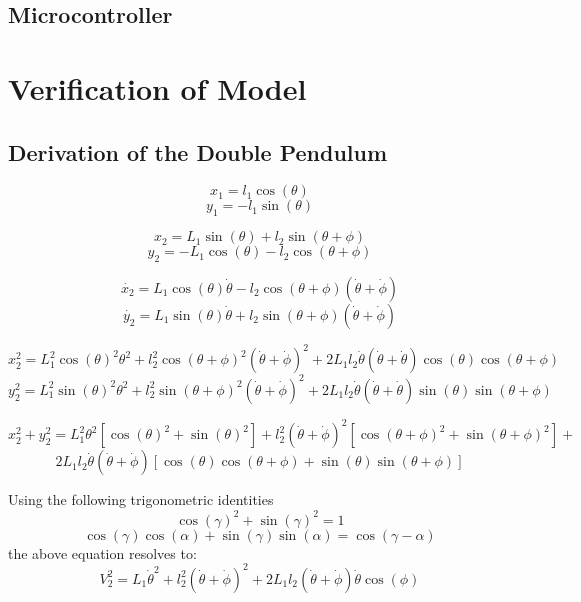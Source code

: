 \documentclass[a4paper,12pt]{article}
\begin{document}
	\subsection{Microcontroller}
	
	
	
	\section{Verification of Model}
	

	\newpage
	
	
	
	\newpage
	\begin{appendices}
		\section{Derivation of the Double Pendulum}
		$$x_{1}= l_{1}\cos(\theta)$$
		$$y_{1} = -l_{1}\sin(\theta)$$
		
		$$x_{2} = L_{1}\sin(\theta) + l_{2}\sin(\theta + \phi)$$
		$$y_{2} = -L_{1}\cos(\theta) - l_{2}\cos(\theta + \phi)$$
		
		$$\dot{x_{2}} = L_{1}\cos(\theta)\dot{\theta} - l_{2}\cos(\theta+\phi)(\dot{\theta}+\dot{\phi}) $$
		$$\dot{y_{2}} = L_{1}\sin(\theta)\dot{\theta}+l_{2}\sin(\theta+\phi)(\dot{\theta}+\dot{\phi})$$
		
		$$x_{2}^2 = L_{1}^2\cos(\theta)^2\theta^2 +l_{2}^2\cos(\theta+\phi)^2(\dot{\theta}+\dot{\phi})^2 + 2L_{1}l_{2}\dot{\theta}(\dot{\theta}+\dot{\theta})\cos(\theta)\cos(\theta+\phi)$$
		$$y_{2}^2 = L_{1}^2\sin(\theta)^2\theta^2 +l_{2}^2\sin(\theta+\phi)^2(\dot{\theta}+\dot{\phi})^2 + 2L_{1}l_{2}\dot{\theta}(\dot{\theta}+\dot{\theta})\sin(\theta)\sin(\theta+\phi)$$
		
		$$x_{2}^2+y_{2}^2 = L_{1}^2\theta^2[\cos(\theta)^2+\sin(\theta)^2]+l_{2}^2(\dot{\theta}+\dot{\phi})^2[\cos(\theta+\phi)^2+\sin(\theta+\phi)^2] +$$
		$$ 2L_{1}l_{2}\dot{\theta}(\dot{\theta}+\dot{\phi})[\cos(\theta)\cos(\theta+\phi)+\sin(\theta)\sin(\theta+\phi)]$$	
		
		Using the following trigonometric identities $$ \cos(\gamma)^2 + \sin(\gamma)^2 = 1 $$ 
		$$ \cos(\gamma)\cos(\alpha)+\sin(\gamma)\sin(\alpha) = \cos(\gamma - \alpha) $$ the above equation resolves to: $$ V_{2}^2 = L_{1}\dot{\theta}^2+l_{2}^2(\dot{\theta}+\dot{\phi})^2 + 
		2L_{1}l_{2}(\dot{\theta}+\dot{\phi})\dot{\theta}\cos(\phi)$$
		

\end{appendices}
\end{document}
